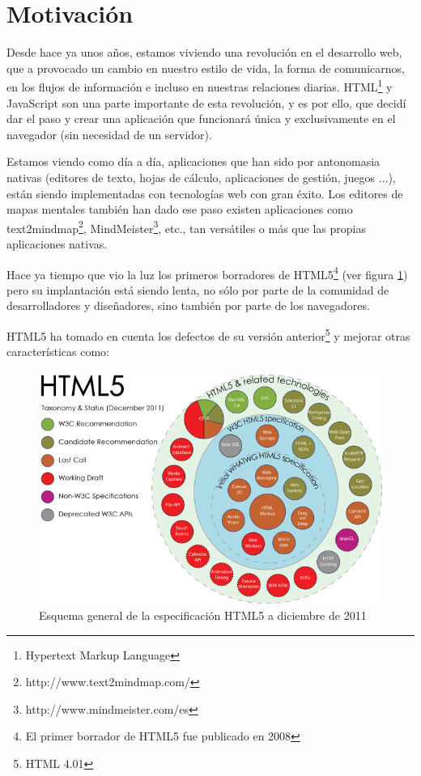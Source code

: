 \section{Motivación}

Desde hace ya unos años, estamos viviendo una revolución en el desarrollo web, que a provocado un cambio en nuestro estilo de vida, la forma de comunicarnos, en los flujos de información e incluso en nuestras relaciones diarias. HTML\footnote{Hypertext Markup Language} y JavaScript son una parte importante de esta revolución, y es por ello, que decidí dar el paso y crear una aplicación que funcionará única y exclusivamente en el navegador (sin necesidad de un servidor). 

Estamos viendo como día a día, aplicaciones que han sido por antonomasia nativas (editores de texto, hojas de cálculo, aplicaciones de gestión, juegos ...), están siendo implementadas con tecnologías web con gran éxito. Los editores de mapas mentales también han dado ese paso existen aplicaciones como text2mindmap\footnote{http://www.text2mindmap.com/}, MindMeister\footnote{http://www.mindmeister.com/es}, etc., tan versátiles o más que las propias aplicaciones nativas.

Hace ya tiempo que vio la luz los primeros borradores de HTML5\footnote{El primer borrador de HTML5 fue publicado en 2008} (ver figura \ref{fig:html5}) pero su implantación está siendo lenta, no sólo por parte de la comunidad de desarrolladores y diseñadores, sino también por parte de los navegadores. 

HTML5 ha tomado en cuenta los defectos de su versión anterior\footnote{HTML 4.01} y mejorar otras características como: 

\begin{figure}[htbp]
\centering
\includegraphics[width=1.1\textwidth]{imagenes/html5}
\caption{Esquema general de la especificación HTML5 a diciembre de 2011}
\label{fig:html5}
\end{figure}


